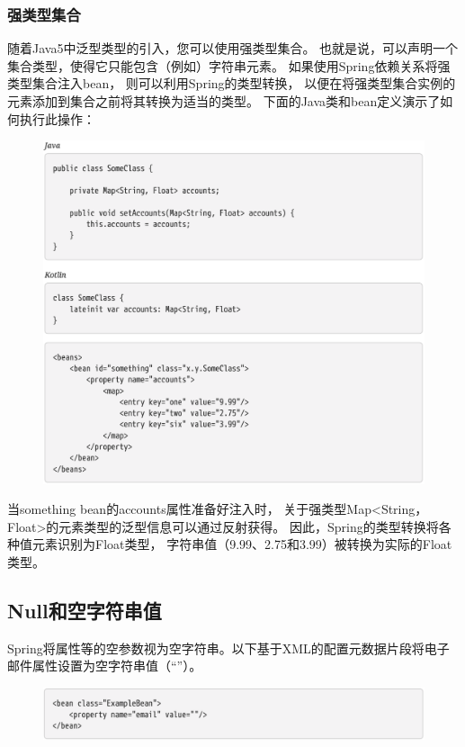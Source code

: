 \subsubsection{强类型集合}

随着Java5中泛型类型的引入，您可以使用强类型集合。
也就是说，可以声明一个集合类型，使得它只能包含（例如）字符串元素。
如果使用Spring依赖关系将强类型集合注入bean，
则可以利用Spring的类型转换，
以便在将强类型集合实例的元素添加到集合之前将其转换为适当的类型。
下面的Java类和bean定义演示了如何执行此操作：

\newpage
\begin{figure}[ht]
    \centering
    \includegraphics[width=1\linewidth]{./Figure/IMG_code_45.png}
\end{figure}

当something bean的accounts属性准备好注入时，
关于强类型Map<String，Float>的元素类型的泛型信息可以通过反射获得。
因此，Spring的类型转换将各种值元素识别为Float类型，
字符串值（9.99、2.75和3.99）被转换为实际的Float类型。

\subsection{Null和空字符串值}
Spring将属性等的空参数视为空字符串。以下基于XML的配置元数据片段将电子邮件属性设置为空字符串值（“”）。

\begin{figure}[ht]
    \centering
    \includegraphics[width=1\linewidth]{./Figure/IMG_code_46.png}
\end{figure}

